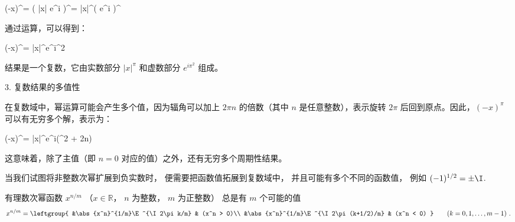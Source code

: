 (-x)^\pi = \left( |x| e^{i\pi} \right)^\pi = |x|^\pi \cdot \left( e^{i\pi} \right)^\pi

通过运算，可以得到：

(-x)^\pi = |x|^\pi \cdot e^{i\pi^2}

结果是一个复数，它由实数部分 $|x|^\pi$ 和虚数部分 $e^{i\pi^2}$ 组成。

3. 复数结果的多值性

在复数域中，幂运算可能会产生多个值，因为辐角可以加上 $2\pi n$ 的倍数（其中 $n$ 是任意整数），表示旋转 $2\pi$ 后回到原点。因此，$(-x)^\pi$ 可以有无穷多个解，表示为：

(-x)^\pi = |x|^\pi \cdot e^{i(\pi^2 + 2n\pi)}

这意味着，除了主值（即 $n = 0$ 对应的值）之外，还有无穷多个周期性结果。



当我们试图将非整数次幂扩展到负实数时， 便需要把函数值拓展到复数域中， 并且可能有多个不同的函数值， 例如 $(-1)^{1/2} = \pm\I$. 

有理数次幂函数 $x^{n/m}$ （$x\in \mathbb R$， $n$ 为整数， $m$ 为正整数） 总是有 $m$ 个可能的值
\begin{equation}
x^{n/m} = \leftgroup{
&\abs{x^n}^{1/m}\E^{\I 2\pi k/m} & (x^n > 0)\\
&\abs{x^n}^{1/m}\E^{\I 2\pi (k+1/2)/m} & (x^n < 0)
}\qquad (k = 0,1,\dots, m-1)~.
\end{equation}